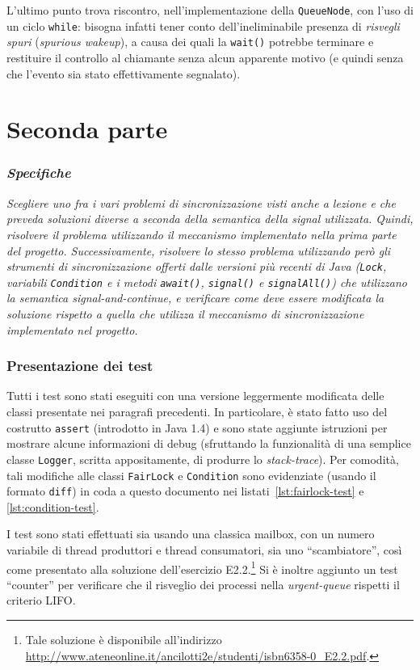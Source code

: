 \documentclass[a4paper,twoside]{article}
\newcommand\code{\lstinline[basicstyle=\normalsize\ttfamily]}
\begin{document}
L'ultimo punto trova riscontro, nell'implementazione della \code|QueueNode|, con l'uso di un ciclo \code|while|: bisogna infatti tener conto dell'ineliminabile presenza di \emph{risvegli spuri} (\emph{spurious wakeup}), a causa dei quali la \code|wait()| potrebbe terminare e restituire il controllo al chiamante senza alcun apparente motivo (e quindi senza che l'evento sia stato effettivamente segnalato).


\part*{Seconda parte}
\section{\textsl{Specifiche}}

\begingroup
\slshape
Scegliere uno fra i vari problemi di sincronizzazione visti anche a lezione e che preveda soluzioni diverse a seconda della semantica della signal utilizzata. Quindi, risolvere il problema utilizzando il meccanismo implementato nella prima parte del progetto. Successivamente, risolvere lo stesso problema utilizzando però gli strumenti di sincronizzazione offerti dalle versioni più recenti di Java (\code|Lock|, variabili \code|Condition| e i metodi \code|await()|, \code|signal()| e \code|signalAll()|) che utilizzano la semantica \emph{signal-and-continue}, e verificare come deve essere modificata la soluzione rispetto a quella che utilizza il meccanismo di sincronizzazione implementato nel progetto.
\endgroup


\section{Presentazione dei test}

Tutti i test sono stati eseguiti con una versione leggermente modificata delle classi presentate nei paragrafi precedenti. In particolare, è stato fatto uso del costrutto \code|assert| (introdotto in Java 1.4) e sono state aggiunte istruzioni per mostrare alcune informazioni di debug (sfruttando la funzionalità di una semplice classe \code|Logger|, scritta appositamente, di produrre lo \emph{stack-trace}). Per comodità, tali modifiche alle classi \code|FairLock| e \code|Condition| sono evidenziate (usando il formato \texttt{diff}) in coda a questo documento nei listati~\ref{lst:fairlock-test} e \ref{lst:condition-test}.

I test sono stati effettuati sia usando una classica mailbox, con un numero variabile di thread produttori e thread consumatori, sia uno “scambiatore”, così come presentato alla soluzione dell'esercizio E2.2.\footnote{Tale soluzione è disponibile all'indirizzo \url{http://www.ateneonline.it/ancilotti2e/studenti/isbn6358-0_E2.2.pdf}.}
Si è inoltre aggiunto un test “counter” per verificare che il risveglio dei processi nella \emph{urgent-queue} rispetti il criterio LIFO.
\end{document}
